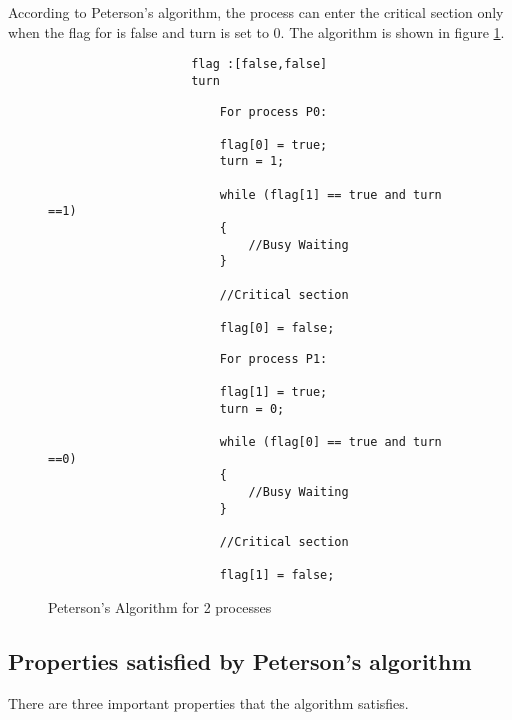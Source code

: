 \documentclass[fleqn]{tukseminar}
\begin{document}
			According to Peterson's algorithm, the process \pa can enter the critical section only when the flag for \pb is false and turn is set to 0. The algorithm is shown in figure \ref{fig:peterson2proc}. \\
			\begin{figure}
				
				
				\begin{verbatim}
					flag :[false,false]
					turn
				\end{verbatim}
				\begin{multicols}{2}
					\begin{verbatim}
						For process P0:
						
						flag[0] = true;
						turn = 1;
						
						while (flag[1] == true and turn ==1)
						{
							//Busy Waiting
						}
						
						//Critical section
						
						flag[0] = false;
					\end{verbatim}
					\columnbreak
					\begin{verbatim}
						For process P1:
						
						flag[1] = true;
						turn = 0;
						
						while (flag[0] == true and turn ==0)
						{
							//Busy Waiting
						}
						
						//Critical section
						
						flag[1] = false;
					\end{verbatim}
				\end{multicols}
				\caption{Peterson's Algorithm for 2 processes}
				\label{fig:peterson2proc}
			\end{figure}
		
			\subsection{Properties satisfied by Peterson's algorithm}
			There are three important properties that the algorithm satisfies.
			
\end{document}
